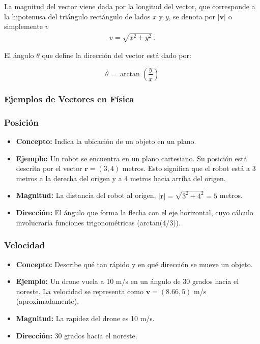 \documentclass[11pt,a4paper]{article}
\begin{document}
La magnitud del vector viene dada por la longitud del vector, que corresponde a la hipotenusa del triángulo rectángulo de lados $x$ y $y$, se denota por $|\boldsymbol{v}|$ o simplemente $v$
\begin{align}
    v = \sqrt{x^2+y^2}\,.
\end{align}



El ángulo $\theta$ que define la dirección del vector está dado por:

$$\theta = \arctan{\left(\frac{y}{x}\right)}$$

\subsubsection{Ejemplos de Vectores en Física}

\subsubsection{Posición}
\begin{itemize}
    \item \textbf{Concepto:} Indica la ubicación de un objeto en un plano.
    \item \textbf{Ejemplo:} Un robot se encuentra en un plano cartesiano. Su posición está descrita por el vector $\textbf{r} = (3, 4)$ metros. Esto significa que el robot está a 3 metros a la derecha del origen y a 4 metros hacia arriba del origen.
    \item \textbf{Magnitud:} La distancia del robot al origen, $|\textbf{r}|=\sqrt{3^2+4^2}= 5$ metros.
    \item \textbf{Dirección:} El ángulo que forma la flecha con el eje horizontal, cuyo cálculo involucraría funciones trigonométricas (arctan(4/3)).
\end{itemize}

\subsubsection{Velocidad}
\begin{itemize}
    \item \textbf{Concepto:} Describe qué tan rápido y en qué dirección se mueve un objeto.
    \item \textbf{Ejemplo:} Un drone vuela a 10 m/s en un ángulo de 30 grados hacia el noreste. La velocidad se representa como $\textbf{v} = (8.66, 5)$ m/s (aproximadamente).
    \item \textbf{Magnitud:} La rapidez del drone es 10 m/s.
    \item \textbf{Dirección:} 30 grados hacia el noreste.
\end{itemize}
\end{document}
